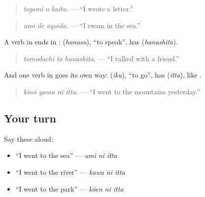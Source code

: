 \begin{quote}
\textbf{ }
\end{quote}

\begin{quote}
\emph{tegami o kaita.} — \textquotedblleft{}I wrote a letter.\textquotedblright{}
\end{quote}

\begin{quote}
\textbf{ }
\end{quote}

\begin{quote}
\emph{umi de oyoida.} — \textquotedblleft{}I swam in the sea.\textquotedblright{}
\end{quote}

A verb in \textbf{} ends in \textbf{}: \textbf{} (\emph{hanasu}), \textquotedblleft{}to speak\textquotedblright{}, has \textbf{} (\emph{hanashita}).

\begin{quote}
\textbf{ }
\end{quote}

\begin{quote}
\emph{tomodachi to hanashita.} — \textquotedblleft{}I talked with a friend.\textquotedblright{}
\end{quote}

And one verb in \textbf{} goes its own way: \textbf{} (\emph{iku}), \textquotedblleft{}to go\textquotedblright{}, has \textbf{} (\emph{itta}), like \textbf{}.

\begin{quote}
\textbf{  }
\end{quote}

\begin{quote}
\emph{kinō yama ni itta.} — \textquotedblleft{}I went to the mountains yesterday.\textquotedblright{}
\end{quote}

\subsection*{Your turn}
Say these aloud:

\begin{itemize}
\raggedright
  \item \textquotedblleft{}I went to the sea\textquotedblright{} — \emph{umi ni itta}
  \item \textquotedblleft{}I went to the river\textquotedblright{} — \emph{kawa ni itta}
  \item \textquotedblleft{}I went to the park\textquotedblright{} — \emph{kōen ni itta}
\end{itemize}

